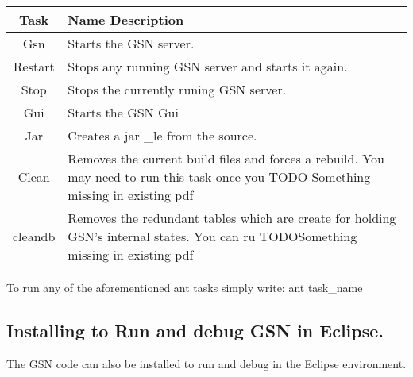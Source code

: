 \setlength{\tymin}{10pt}
\setlength{\tymax}{0.8\textwidth}
\begin{table*}[!htp] 
\centering
{\normalfont\footnotesize
\begin{tabulary}{\textwidth}{|C|J|}%
\hline

Task
 & 
Name Description
 \\
\hline

Gsn
 & 
Starts the GSN server.
 \\
\hline

Restart
 & 
Stops any running GSN server and starts it again.
 \\
\hline

Stop
 & 
Stops the currently runing GSN server.
 \\
\hline

Gui
 & 
Starts the GSN Gui
 \\
\hline

Jar
 & 
Creates a jar \_le from the source.
 \\
\hline

Clean
 & 
Removes the current build files and forces a rebuild. You may need to
run this task once you TODO Something missing in existing pdf
 \\
\hline

cleandb
 & 
Removes the redundant tables which are create for holding GSN's
internal states. You can ru TODOSomething missing in existing pdf
 \\
\hline
\end{tabulary}
}\caption{}
\label{table:gsn_ant_tasks}
\end{table*}

{\footnotesize To run any of the aforementioned ant tasks simply
write: ant task\_name}

\subsection{Installing to Run and debug GSN in Eclipse.}

The GSN code can also be installed to run and debug in the Eclipse
environment.

